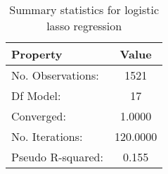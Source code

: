 \begin{table}
\centering
\caption{Summary statistics for logistic lasso regression}
\label{tab:stats_logit_summary}
\begin{tabular}{lc}
\toprule
         Property &    Value \\
\midrule
No. Observations: &     1521 \\
        Df Model: &       17 \\
       Converged: &   1.0000 \\
  No. Iterations: & 120.0000 \\
Pseudo R-squared: &    0.155 \\
\bottomrule
\end{tabular}
\end{table}
